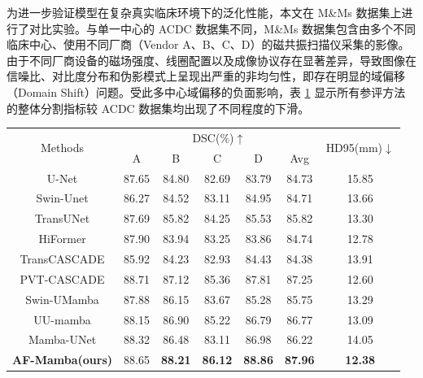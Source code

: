 \documentclass[12pt, a4paper, twoside]{article}
\begin{document}
为进一步验证模型在复杂真实临床环境下的泛化性能，本文在 M\&Ms 数据集上进行了对比实验。与单一中心的 ACDC 数据集不同，M\&Ms 数据集包含由多个不同临床中心、使用不同厂商（Vendor A、B、C、D）的磁共振扫描仪采集的影像。由于不同厂商设备的磁场强度、线圈配置以及成像协议存在显著差异，导致图像在信噪比、对比度分布和伪影模式上呈现出严重的非均匀性，即存在明显的域偏移（Domain Shift）问题。受此多中心域偏移的负面影响，表 \ref{tab:mms_afb_results} 显示所有参评方法的整体分割指标较 ACDC 数据集均出现了不同程度的下滑。

\begin{table}[htbp]
    \centering
    \label{tab:mms_afb_results}
    \begin{tabular}{ccccccc}
        \toprule
        \multirow{2}{*}{Methods} & \multicolumn{5}{c}{DSC(\%)$\uparrow$} & \multirow{2}{*}{HD95(mm)$\downarrow$} \\
        & A & B & C & D & Avg & \\
        \midrule
        U-Net\cite{1} & 87.65 & 84.80 & 82.69 & 83.79 & 84.73 & 15.85 \\
        Swin-Unet\cite{2} & 86.27 & 84.52 & 83.11 & 84.95 & 84.71 & 13.66 \\
        TransUNet\cite{16} & 87.69 & 85.82 & 84.25 & 85.53 & 85.82 & 13.30 \\
        \hdashline
        HiFormer\cite{17} & 87.90 & 83.94 & 83.25 & 83.86 & 84.74 & 12.78 \\
        TransCASCADE\cite{18} & 85.92 & 84.23 & 82.93 & 84.43 & 84.38 & 13.91 \\
        PVT-CASCADE\cite{18} & 88.71 & 87.12 & 85.36 & 87.81 & 87.25 & 12.60 \\
        \hdashline
        Swin-UMamba\cite{19} & 87.88 & 86.15 & 83.67 & 85.28 & 85.75 & 13.29 \\
        UU-mamba\cite{20} & 88.15 & 86.90 & 85.22 & 86.79 & 86.77 & 13.09 \\
        Mamba-UNet\cite{14} & 88.32 & 86.48 & 83.11 & 86.98 & 86.22 & 14.05 \\
        \midrule
        \textbf{AF-Mamba(ours)} & 88.65 & \textbf{88.21} & \textbf{86.12} & \textbf{88.86} & \textbf{87.96} & \textbf{12.38} \\
        \bottomrule
    \end{tabular}
\end{table}
\end{document}
